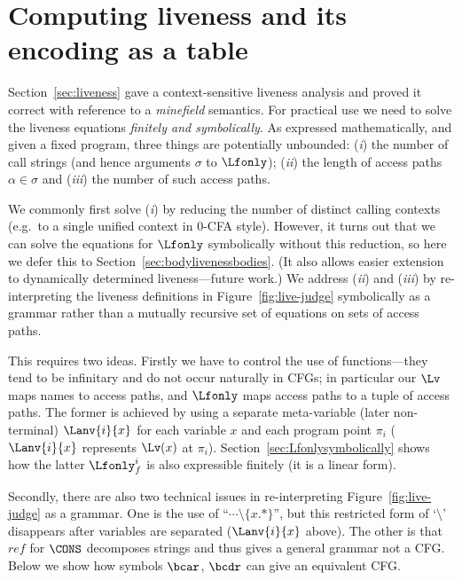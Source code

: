 
\section{Computing liveness and its encoding as a table}\label{sec:computing}

Section~\ref{sec:liveness} gave a context-sensitive liveness analysis
and proved it correct with reference to a {\em minefield} semantics.
For practical use we need to solve the liveness equations {\em finitely and
symbolically}.  As expressed mathematically, and given a fixed program,
three things are potentially unbounded:
({\em i\/}) the number of call strings (and hence arguments $\sigma$ to $\Lfonly$);
({\em ii\/}) the length of access paths $\alpha \in \sigma$ and
({\em iii\/}) the number of such access paths.

We commonly first solve ({\em i\/}) by reducing the number of distinct
calling contexts
(e.g.\ to a single unified context in 0-CFA style).
However, it turns out that we can solve the equations for $\Lfonly$ symbolically
without this reduction, so here we defer this to Section~\ref{sec:bodylivenessbodies}.
(It also allows easier extension to  dynamically determined liveness---future work.)
%
We address ({\em ii\/}) and ({\em iii\/}) by 
re-interpreting
the liveness definitions in Figure~\ref{fig:live-judge} symbolically as a grammar
rather than a mutually recursive set of equations on sets of access paths.

This requires two ideas.  Firstly we have to control the use of functions---they
tend to be infinitary and do not occur naturally in CFGs; in particular our
$\Lv$ maps names to access paths, and  $\Lfonly$ maps access paths
to a tuple of access paths.  The former is achieved by using a separate
meta-variable (later non-terminal)
$\Lanv{i}{x}$ for each variable $x$ and each program point $\pi_i$
($\Lanv{i}{x}$ represents $\Lv(x)$ at $\pi_i$).
Section~\ref{sec:Lfonlysymbolically} shows how the latter $\Lfonly_f^i$ is also
expressible finitely (it is a linear form).

Secondly, there are also two technical issues in re-interpreting
Figure~\ref{fig:live-judge} as a grammar.
One is the use of ``$\cdots \setminus \{x.*\}$'', but this restricted form of `$\setminus$'
disappears after variables are separated ($\Lanv{i}{x}$ above). The other
is that $\mathit{ref}$ for $\CONS$ decomposes strings and thus gives a general grammar
not a CFG\@.
Below we show how symbols $\bcar$, $\bcdr$ can give an equivalent CFG\@.

